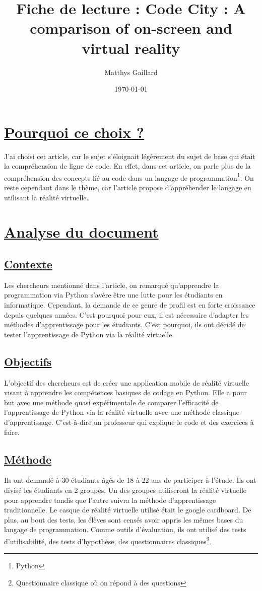 \documentclass[a4paper,10pt, oneside]{article}
\title{Fiche de lecture : Code City : A comparison of on-screen and virtual reality}
\author{Matthys Gaillard}
\date{\today}
\begin{document}
\maketitle
\section{\ul{Pourquoi ce choix ?}}
        \par J'ai choisi cet article\cite{A1}, car le sujet s'éloignait légèrement du sujet de base qui était la compréhension de ligne de code.
        En effet, dans cet article, on parle plus de la compréhension des concepts lié au code dans un langage de programmation\footnote{Python}.
        On reste cependant dans le thème, car l'article propose d'appréhender le langage en utilisant la réalité virtuelle.
\section{\ul{Analyse du document}}
\subsection{\ul{Contexte}} 
        \par Les chercheurs mentionné dans l'article, on remarqué qu'apprendre la programmation via Python s'avère être une lutte pour les étudiants en informatique.
        Cependant, la demande de ce genre de profil est en forte croissance depuis quelques années. C'est pourquoi pour eux, il est nécessaire d'adapter les méthodes
        d'apprentissage pour les étudiants. C'est pourquoi, ils ont décidé de tester l'apprentissage de Python via la réalité virtuelle.
\subsection{\ul{Objectifs}}
        \par L'objectif des chercheurs est de créer une application mobile de réalité virtuelle visant à apprendre les compétences basiques de codage en Python.
        Elle a pour but avec une méthode quasi expérimentale de comparer l'efficacité de l'apprentissage de Python via la réalité virtuelle avec une méthode classique d'apprentissage. C'est-à-dire
        un professeur qui explique le code et des exercices à faire.
\subsection{\ul{Méthode}}
        \par Ils ont demandé à 30 étudiants âgés de 18 à 22 ans de participer à l'étude. Ils ont divisé les étudiants en 2 groupes. Un des groupes utiliseront la réalité virtuelle pour apprendre
        tandis que l'autre suivra la méthode d'apprentissage traditionnelle. Le casque de réalité virtuelle utilisé était le google cardboard. De plus, au bout des tests, les élèves sont censés avoir
        appris les mêmes bases du langage de programmation. Comme outils d'évaluation, ils ont utilisé des tests d'utilisabilité, des tests d'hypothèse, des questionnaires classiques\footnote{Questionnaire classique où on répond à des questions}.
\end{document}
